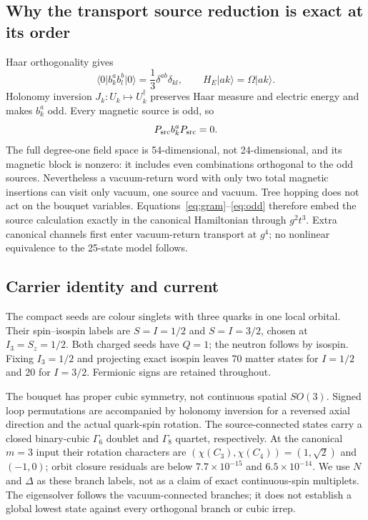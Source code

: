 \documentclass[11pt]{article}
\newcommand{\ket}[1]{\lvert #1\rangle}
\newcommand{\bra}[1]{\langle #1\rvert}
\newcommand{\Ga}{\Gamma}
\begin{document}
\subsection{Why the transport source reduction is exact at its order}
Haar orthogonality gives
\begin{equation}
 \bra0 b_k^a b_l^b\ket0=\frac13\delta^{ab}\delta_{kl},\qquad
 H_E\ket{ak}=\Omega\ket{ak}. \label{eq:gram}
\end{equation}
Holonomy inversion $J_k:U_k\mapsto U_k^\dagger$ preserves Haar measure and electric energy and makes $b_k^a$ odd. Every magnetic source is odd, so
\begin{equation}
 P_{\rm src}b_k^aP_{\rm src}=0. \label{eq:odd}
\end{equation}
The full degree-one field space is 54-dimensional, not 24-dimensional, and its magnetic block is nonzero: it includes even combinations orthogonal to the odd sources. Nevertheless a vacuum-return word with only two total magnetic insertions can visit only vacuum, one source and vacuum. Tree hopping does not act on the bouquet variables. Equations~\eqref{eq:gram}--\eqref{eq:odd} therefore embed the source calculation exactly in the canonical Hamiltonian through $g^2t^3$. Extra canonical channels first enter vacuum-return transport at $g^4$; no nonlinear equivalence to the 25-state model follows.

\subsection{Carrier identity and current}
The compact seeds are colour singlets with three quarks in one local orbital. Their spin--isospin labels are $S=I=1/2$ and $S=I=3/2$, chosen at $I_3=S_z=1/2$. Both charged seeds have $Q=1$; the neutron follows by isospin. Fixing $I_3=1/2$ and projecting exact isospin leaves 70 matter states for $I=1/2$ and 20 for $I=3/2$. Fermionic signs are retained throughout.

The bouquet has proper cubic symmetry, not continuous spatial $SO(3)$. Signed loop permutations are accompanied by holonomy inversion for a reversed axial direction and the actual quark-spin rotation. The source-connected states carry a closed binary-cubic $\Ga_6$ doublet and $\Ga_8$ quartet, respectively. At the canonical $m=3$ input their rotation characters are $(\chi(C_3),\chi(C_4))=(1,\sqrt2)$ and $(-1,0)$; orbit closure residuals are below $7.7\times10^{-15}$ and $6.5\times10^{-14}$. We use $N$ and $\Delta$ as these branch labels, not as a claim of exact continuous-spin multiplets. The eigensolver follows the vacuum-connected branches; it does not establish a global lowest state against every orthogonal branch or cubic irrep.
\end{document}

